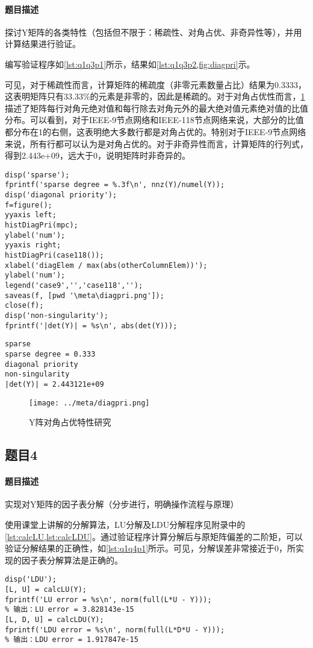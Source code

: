 \documentclass[a4paper,12pt]{article}
\begin{document}
    \paragraph{题目描述} 探讨Y矩阵的各类特性（包括但不限于：稀疏性、对角占优、非奇异性等），并用计算结果进行验证。

    编写验证程序如\cref{lst:q1q3p1}所示，结果如\cref{lst:q1q3p2,fig:diagpri}示。

    可见，对于稀疏性而言，计算矩阵的稀疏度（非零元素数量占比）结果为0.3333，这表明矩阵只有33.33\%的元素是非零的，因此是稀疏的。对于对角占优性而言，\cref{fig:diagpri}描述了矩阵每行对角元绝对值和每行除去对角元外的最大绝对值元素绝对值的比值分布。可以看到，对于IEEE-9节点网络和IEEE-118节点网络来说，大部分的比值都分布在1的右侧，这表明绝大多数行都是对角占优的。特别对于IEEE-9节点网络来说，所有行都可以认为是对角占优的。对于非奇异性而言，计算矩阵的行列式，得到2.443e+09，远大于0，说明矩阵时非奇异的。

    \begin{lstlisting}[style=Matlab-editor,basicstyle=\mlttfamily,label=lst:q1q3p1,caption={矩阵特性验证程序}]
%% feature of Y
disp('sparse');
fprintf('sparse degree = %.3f\n', nnz(Y)/numel(Y));
disp('diagonal priority');
f=figure();
yyaxis left;
histDiagPri(mpc);
ylabel('num');
yyaxis right;
histDiagPri(case118());
xlabel('diagElem / max(abs(otherColumnElem))');
ylabel('num');
legend('case9','','case118','');
saveas(f, [pwd '\meta\diagpri.png']);
close(f);
disp('non-singularity');
fprintf('|det(Y)| = %s\n', abs(det(Y)));
    \end{lstlisting}
    \begin{lstlisting}[label=lst:q1q3p2,caption={矩阵特性验证结果}]
sparse
sparse degree = 0.333
diagonal priority
non-singularity
|det(Y)| = 2.443121e+09
    \end{lstlisting}
    \begin{figure}
      \texttt{[image: ../meta/diagpri.png]}
      \caption{Y阵对角占优特性研究}
      \label{fig:diagpri}
    \end{figure}
    \subsection{题目4}
    \paragraph{题目描述} 实现对Y矩阵的因子表分解（分步进行，明确操作流程与原理）

    使用课堂上讲解的分解算法，LU分解及LDU分解程序见附录中的\cref{lst:calcLU,lst:calcLDU}。通过验证程序计算分解后与原矩阵偏差的二阶矩，可以验证分解结果的正确性，如\cref{lst:q1q4p1}所示。可见，分解误差非常接近于0，所实现的因子表分解算法是正确的。
    \begin{lstlisting}[style=Matlab-editor,basicstyle=\mlttfamily,label=lst:q1q4p1,caption={因子表分解及正确性验证}]
%% LDU
disp('LDU');
[L, U] = calcLU(Y);
fprintf('LU error = %s\n', norm(full(L*U - Y)));
% 输出：LU error = 3.828143e-15
[L, D, U] = calcLDU(Y);
fprintf('LDU error = %s\n', norm(full(L*D*U - Y)));
% 输出：LDU error = 1.917847e-15
    \end{lstlisting}
\end{document}
